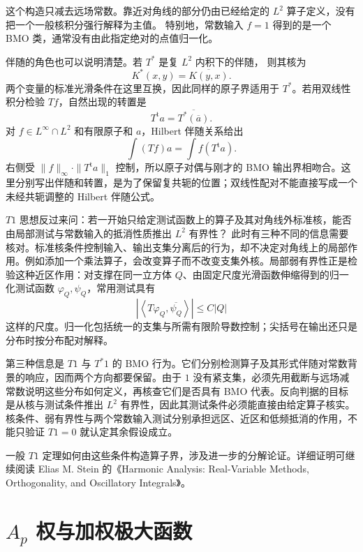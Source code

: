 这个构造只减去远场常数。靠近对角线的部分仍由已经给定的
\(L^2\) 算子定义，没有把一个一般核积分强行解释为主值。
特别地，常数输入 \(f=1\) 得到的是一个 BMO 类，通常没有由此指定绝对的点值归一化。

\ProseParagraphBreak

伴随的角色也可以说明清楚。若 \(T^*\) 是复 \(L^2\) 内积下的伴随，
则其核为
\[
 K^*(x,y)=\overline{K(y,x)}.
\]
两个变量的标准光滑条件在这里互换，因此同样的原子界适用于
\(T^*\)。若用双线性积分检验 \(Tf\)，自然出现的转置是
\[
 T^{\mathrm t}a=\overline{T^*(\overline a)}.
\]
对 \(f\in L^\infty\cap L^2\) 和有限原子和 \(a\)，Hilbert 伴随关系给出
\[
 \int (Tf)a=\int f(T^{\mathrm t}a).
\]
右侧受
\(\|f\|_\infty\cdot\|T^{\mathrm t}a\|_1\) 控制，所以原子对偶与刚才的
BMO 输出界相吻合。这里分别写出伴随和转置，是为了保留复共轭的位置；双线性配对不能直接写成一个未经共轭调整的 Hilbert 伴随公式。

\ProseParagraphBreak

\(T1\) 思想反过来问：若一开始只给定测试函数上的算子及其对角线外标准核，能否由局部测试与常数输入的抵消性质推出 \(L^2\) 有界性？
此时有三种不同的信息需要核对。标准核条件控制输入、输出支集分离后的行为，却不决定对角线上的局部作用。例如添加一个乘法算子，会改变算子而不改变支集外核。局部弱有界性正是检验这种近区作用：对支撑在同一立方体 \(Q\)、由固定尺度光滑函数伸缩得到的归一化测试函数
\(\varphi_Q,\psi_Q\)，常用测试具有
\[
 \left|\left\langle T\varphi_Q,\overline{\psi_Q}\right\rangle\right|
 \le C|Q|
\]
这样的尺度。归一化包括统一的支集与所需有限阶导数控制；尖括号在输出还只是分布时按分布配对解释。

\ProseParagraphBreak

第三种信息是 \(T1\) 与 \(T^*1\) 的 BMO 行为。它们分别检测算子及其形式伴随对常数背景的响应，因而两个方向都要保留。由于 \(1\) 没有紧支集，必须先用截断与远场减常数说明这些分布如何定义，再核查它们是否具有 BMO 代表。反向判据的目标是从核与测试条件推出 \(L^2\) 有界性，因此其测试条件必须能直接由给定算子核实。核条件、弱有界性与两个常数输入测试分别承担远区、近区和低频抵消的作用，不能只验证 \(T1=0\) 就认定其余假设成立。

\ProseParagraphBreak

一般 \(T1\) 定理如何由这些条件构造算子界，涉及进一步的分解论证。详细证明可继续阅读
Elias M. Stein 的《Harmonic Analysis: Real-Variable Methods, Orthogonality, and Oscillatory Integrals》\cite{Stein1993Harmonic}。


\section{\texorpdfstring{\(A_p\)}{Aₚ} 权与加权极大函数}
\label{b2:sec:app-C-5}

